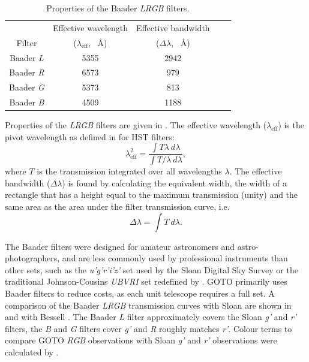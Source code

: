 \begin{colsection}
\begin{table}[t]
    \begin{center}
        \begin{tabular}{c|cccc} %
             & Effective wavelength & Effective bandwidth\\
            Filter & ($\lambda_\text{eff}$, \SI{}{\angstrom}) & ($\Delta\lambda$, \SI{}{\angstrom}) \\
            \midrule
            Baader \textit{L} & 5355 & 2942 \\
            Baader \textit{R} & 6573 &  979 \\
            Baader \textit{G} & 5373 &  813 \\
            Baader \textit{B} & 4509 & 1188 \\
        \end{tabular}
    \end{center}
    \caption[Baader filter properties]{
        Properties of the Baader \textit{LRGB} filters.
    }\label{tab:filters}
\end{table}

Properties of the \textit{LRGB} filters are given in . The effective wavelength ($\lambda_\text{eff}$) is the pivot wavelength as defined in \citet{HST_calibration} for HST filters:
%
\begin{equation}
    \lambda_\text{eff}^2 = \frac{\int T\lambda~d\lambda}{\int T/\lambda~d\lambda},
    \label{eq:pivot_wavelength}
\end{equation}
%
where $T$ is the transmission integrated over all wavelengths $\lambda$. The effective bandwidth ($\Delta\lambda$) is found by calculating the equivalent width, the width of a rectangle that has a height equal to the maximum transmission (unity) and the same area as the area under the filter transmission curve, i.e.
%
\begin{equation}
    \Delta\lambda = \int T~d\lambda.
    \label{eq:bandwidth}
\end{equation}

The Baader filters were designed for amateur astronomers and astro-photographers, and are less commonly used by professional instruments than other sets, such as the \textit{u'g'r'i'z'} set used by the Sloan Digital Sky Survey  \citep{Sloan_filters} or the traditional Johnson-Cousins \textit{UBVRI} set redefined by \citet{Bessell_filters}. GOTO primarily uses Baader filters to reduce costs, as each unit telescope requires a full set. A comparison of the Baader \textit{LRGB} transmission curves with Sloan are shown in  and with Bessell . The Baader \textit{L} filter approximately covers the Sloan \textit{g'} and \textit{r'} filters, the \textit{B} and \textit{G} filters cover \textit{g'} and \textit{R} roughly matches \textit{r'}. Colour terms to compare GOTO \textit{RGB} observations with Sloan \textit{g'} and \textit{r'} observations were calculated by \citet{Phaethon}.


\end{colsection}
